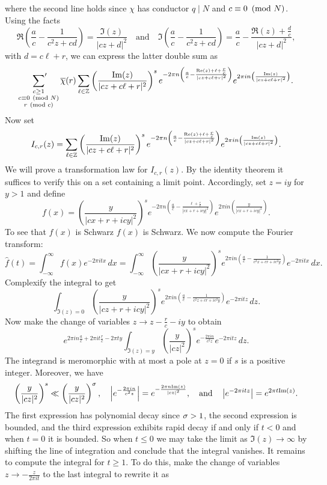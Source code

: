     where the second line holds since $\chi$ has conductor $q \mid N$ and $c \equiv 0 \ \left(\text{mod }N\right)$. Using the facts
    \[
      \Re\left(\frac{a}{c}-\frac{1}{c^{2}z+cd}\right) = \frac{\Im(z)}{|cz+d|^{2}} \quad \text{and} \quad \Im\left(\frac{a}{c}-\frac{1}{c^{2}z+cd}\right) = \frac{a}{c}-\frac{\Re(z)+\frac{d}{c}}{|cz+d|^{2}},
    \]
    with $d = c\ell+r$, we can express the latter double sum as
    \[
      \sideset{}{'}\sum_{\substack{c \ge 1 \\ c \equiv 0 \ \left(\text{mod }N\right) \\ r \ \left(\text{mod }c\right)}}\overline{\chi}(r)\sum_{\ell \in \mathbb{Z}}\left(\frac{\mathrm{Im}(z)}{|cz+c\ell+r|^{2}}\right)^{s}e^{-2\pi n\left(\frac{a}{c}-\frac{\mathrm{Re}(z)+\ell+\frac{r}{c}}{|cz+c\ell+r|^{2}}\right)}e^{2\pi i n\left(\frac{\mathrm{Im}(z)}{|cz+c\ell+r|^{2}}\right)}.
    \]
    Now set
    \[
      I_{c,r}(z) = \sum_{\ell \in \mathbb{Z}}\left(\frac{\mathrm{Im}(z)}{|cz+c\ell+r|^{2}}\right)^{s}e^{-2\pi n\left(\frac{a}{c}-\frac{\mathrm{Re}(z)+\ell+\frac{r}{c}}{|cz+c\ell+r|^{2}}\right)}e^{2\pi i n\left(\frac{\mathrm{Im}(z)}{|cz+c\ell+r|^{2}}\right)}.
    \]
    We will prove a transformation law for $I_{c,r}(z)$. By the identity theorem it suffices to verify this on a set containing a limit point. Accordingly, set $z = iy$ for $y > 1$ and define
    \[
      f(x) = \left(\frac{y}{|cx+r+icy|^{2}}\right)^{s}e^{-2\pi n\left(\frac{a}{c}-\frac{\ell+\frac{r}{c}}{|cx+r+icy|^{2}}\right)}e^{2\pi i n\left(\frac{y}{|cx+r+icy|^{2}}\right)}.
    \]
    To see that $f(x)$ is Schwarz  $f(x)$ is Schwarz. We now compute the Fourier transform:
    \[
      \hat{f}(t) = \int_{-\infty}^{\infty}f(x)e^{-2\pi itx}\,dx = \int_{-\infty}^{\infty}\left(\frac{y}{|cx+r+icy|^{2}}\right)^{s}e^{2\pi in\left(\frac{a}{c}-\frac{1}{c^{2}x+cr+ic^{2}y}\right)}e^{-2\pi itx}\,dx.
    \]
    Complexify the integral to get
    \[
      \int_{\Im(z) = 0}\left(\frac{y}{|cz+r+icy|^{2}}\right)^{s}e^{2\pi in\left(\frac{a}{c}-\frac{1}{c^{2}z+cr+ic^{2}y}\right)}e^{-2\pi itz}\,dz.
    \]
    Now make the change of variables $z \to z-\frac{r}{c}-iy$ to obtain
    \[
      e^{2\pi in\frac{a}{c}+2\pi it\frac{r}{c}-2\pi ty}\int_{\Im(z) = y}\left(\frac{y}{|cz|^{2}}\right)^{s}e^{-\frac{2\pi in}{c^{2}z}}e^{-2\pi itz}\,dz.
    \]
    The integrand is meromorphic with at most a pole at $z = 0$ if $s$ is a positive integer. Moreover, we have
    \[
      \left(\frac{y}{|cz|^{2}}\right)^{s} \ll \left(\frac{y}{|cz|^{2}}\right)^{\sigma}, \quad \left|e^{-\frac{2\pi in}{c^{2}z}}\right| = e^{-\frac{2\pi n\mathrm{Im}(z)}{|cz|^{2}}}, \quad \text{and} \quad \left|e^{-2\pi itz}\right| = e^{2\pi t\mathrm{Im}(z)}.
    \]
    The first expression has polynomial decay since $\sigma > 1$, the second expression is bounded, and the third expression exhibits rapid decay if and only if $t < 0$ and when $t = 0$ it is bounded. So when $t \le 0$ we may take the limit as $\Im(z) \to \infty$  by shifting the line of integration and conclude that the integral vanishes. It remains to compute the integral for $t \ge 1$. To do this, make the change of variables $z \to -\frac{z}{2\pi it}$ to the last integral to rewrite it as
